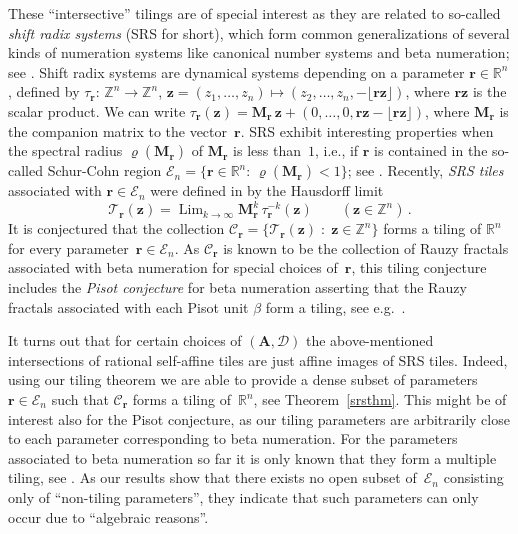 \documentclass[12pt]{amsart}
\theoremstyle{definition}
\theoremstyle{remark}
\numberwithin{equation}{section}
\begin{document}
These ``intersective'' tilings are of special interest as they are related to so-called \emph{shift radix systems} (SRS for short), which form common generalizations of several kinds of numeration systems like canonical number systems and beta numeration; see \cite{Akiyama-Borbeli-Brunotte-Pethoe-Thuswaldner:05}.
Shift radix systems are dynamical systems depending on a parameter $\mathbf{r} \in \mathbb{R}^n$, defined by $\tau_\mathbf{r}:\, \mathbb{Z}^n \to \mathbb{Z}^n$,  $\mathbf{z} = (z_1, \ldots, z_n) \mapsto (z_2, \ldots, z_n,-\lfloor \mathbf{r z} \rfloor)$, where $\mathbf{r z}$ is the scalar product.
We can write $\tau_\mathbf{r}(\mathbf{z}) = \mathbf{M}_\mathbf{r}\, \mathbf{z} + (0, \ldots, 0, \mathbf{r z} - \lfloor \mathbf{r z} \rfloor)$, where $\mathbf{M}_\mathbf{r}$ is the companion matrix to the vector~$\mathbf{r}$.
SRS exhibit interesting properties when the spectral radius $\varrho(\mathbf{M}_\mathbf{r})$ of $\mathbf{M}_\mathbf{r}$ is less than~$1$, i.e., if $\mathbf{r}$ is contained in the so-called Schur-Cohn region $\mathcal{E}_n = \{\mathbf{r}\in\mathbb{R}^n:\, \varrho(\mathbf{M}_\mathbf{r}) < 1\}$; see \cite{Schur:18}. Recently, \emph{SRS tiles} associated with $\mathbf{r} \in \mathcal{E}_n$ were defined in \cite{BSSST:11} by the Hausdorff limit
\begin{equation}\label{srstiledef}
\mathcal{T}_\mathbf{r}(\mathbf{z}) = \mathop{\mathrm{Lim}}_{k \to \infty} \mathbf{M}_\mathbf{r}^k\, \tau_\mathbf{r}^{-k}(\mathbf{z}) \qquad (\mathbf{z} \in \mathbb{Z}^n)\,.
\end{equation}
It is conjectured that the collection $\mathcal{C}_\mathbf{r} =\{\mathcal{T}_\mathbf{r}(\mathbf{z})\;:\; \mathbf{z}\in \mathbb{Z}^n \}$ forms a tiling of $\mathbb{R}^n$ for every parameter~$\mathbf{r} \in \mathcal{E}_n$. 
As $\mathcal{C}_\mathbf{r}$ is known to be the collection of Rauzy fractals associated with beta numeration for special choices of~$\mathbf{r}$, this tiling conjecture includes the \emph{Pisot conjecture} for beta numeration asserting that the Rauzy fractals associated with each Pisot unit $\beta$ form a tiling, see e.g.\ \cite{Akiyama:02,Berthe-Siegel:05}.

It turns out that for certain choices of $(\mathbf{A},\mathcal{D})$ the above-mentioned intersections of rational self-affine tiles are just affine images of SRS tiles. Indeed, using our tiling theorem we are able to provide a dense subset of parameters $\mathbf{r} \in \mathcal{E}_n$ such that $\mathcal{C}_\mathbf{r}$ forms a tiling of~$\mathbb{R}^n$, see Theorem~\ref{srsthm}. This might be of interest also for the Pisot conjecture, as our tiling parameters are arbitrarily close to each parameter corresponding to beta numeration. For the parameters associated to beta numeration so far it is only known that they form a multiple tiling, see \cite{Berthe-Siegel:05,Kalle-Steiner:12}. 
As our results show that there exists no open subset of~$\mathcal{E}_n$ consisting only of ``non-tiling parameters'', they indicate that such parameters can only occur due to ``algebraic reasons''. 
\end{document}
